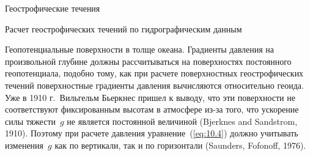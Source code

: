 \begin{chapter}{Геострофические течения}
\begin{section}{Расчет геострофических течений по гидрографическим данным}
\begin{paragraph}{Геопотенциальные поверхности в толще океана.}
%
Градиенты давления на произвольной глубине должны рассчитываться на
поверхностях постоянного геопотенциала, подобно тому, как при расчете 
поверхностных геострофических течений поверхностные градиенты давления
вычисляются относительно геоида.
Уже в 1910 г.\ Вильгельм Бьеркнес пришел к выводу, что эти поверхности 
не соответствуют фиксированным высотам в атмосфере из-за того, что
ускорение силы тяжести~$g$ не является постоянной величиной (Bjerknes and Sandstrom, 1910). 
Поэтому при расчете давления уравнение~(\ref{eq:10.4}) должно
учитывать изменения~$g$ как по вертикали, так и по горизонтали
(Saunders, Fofonoff, 1976).
%


\end{paragraph}
\end{section}
\end{chapter}
